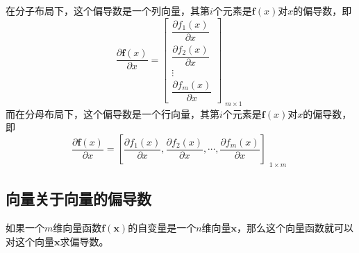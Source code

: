 在分子布局下，这个偏导数是一个列向量，其第$i$个元素是$\bm{f}(x)$对$x$的偏导数，即
\begin{equation}
	\frac{\partial \bm{f}(x)}{\partial x}
	=\begin{bmatrix}
		\dfrac{\partial f_1(x)}{\partial x}\\[2ex]
		\dfrac{\partial f_2(x)}{\partial x}\\[2ex]
		\vdots\\[2ex]
		\dfrac{\partial f_m(x)}{\partial x}
	\end{bmatrix}_{\substack{\scriptstyle m\times 1}}
\end{equation}
而在分母布局下，这个偏导数是一个行向量，其第$i$个元素是$\bm{f}(x)$对$x$的偏导数，即
\begin{equation}
	\frac{\partial \bm{f}(x)}{\partial x}
	=\left[\frac{\partial f_1(x)}{\partial x},\frac{\partial f_2(x)}{\partial x},\cdots,\frac{\partial f_m(x)}{\partial x}\right]_{\substack{\scriptstyle 1\times m}}
\end{equation}

\subsection{向量关于向量的偏导数}
如果一个$m$维向量函数$\bm{f}(\bm{x})$的自变量是一个$n$维向量$\bm{x}$，那么这个向量函数就可以对这个向量$\bm{x}$求偏导数。

